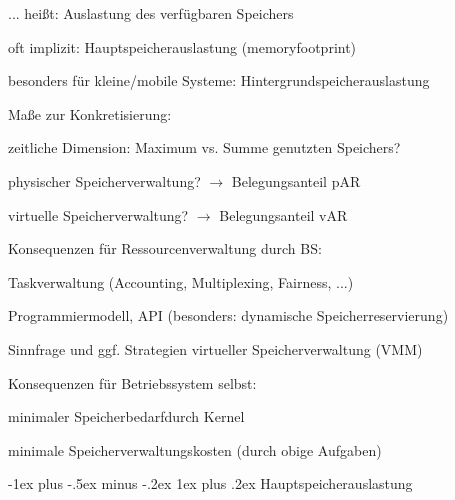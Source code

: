 \documentclass[a4paper]{article}
\makeatletter
\renewcommand{\subsubsection}{\@startsection{subsubsection}{3}{0mm}%
 {-1ex plus -.5ex minus -.2ex}%
 {1ex plus .2ex}%
 {\normalfont\small\bfseries}}
\makeatother
\begin{document}
\begin{multicols}{3}
    \begin{itemize*}
        \item
        ... heißt: Auslastung des verfügbaren Speichers
        \begin{itemize*}
            \item oft implizit: Hauptspeicherauslastung (memoryfootprint)
            \item besonders für kleine/mobile Systeme: Hintergrundspeicherauslastung
        \end{itemize*}
        \item
        Maße zur Konkretisierung:
        \begin{itemize*}
            \item zeitliche Dimension: Maximum vs. Summe genutzten Speichers?
            \item physischer Speicherverwaltung? $\rightarrow$ Belegungsanteil pAR
            \item virtuelle Speicherverwaltung? $\rightarrow$ Belegungsanteil vAR
        \end{itemize*}
        \item
        Konsequenzen für Ressourcenverwaltung durch BS:
        \begin{itemize*}
            \item Taskverwaltung (Accounting, Multiplexing, Fairness, ...)
            \item Programmiermodell, API (besonders: dynamische Speicherreservierung)
            \item Sinnfrage und ggf. Strategien virtueller Speicherverwaltung (VMM)
        \end{itemize*}
        \item
        Konsequenzen für Betriebssystem selbst:
        \begin{itemize*}
            \item minimaler Speicherbedarfdurch Kernel
            \item minimale Speicherverwaltungskosten (durch obige Aufgaben)
        \end{itemize*}
    \end{itemize*}


    \subsubsection{Hauptspeicherauslastung}

    \begin{itemize*}
        \item
    \end{itemize*}


\end{multicols}
\end{document}
